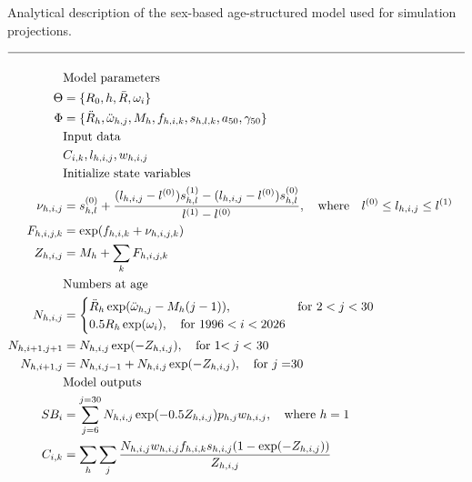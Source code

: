 \begin{table}
	\caption{Analytical description of the sex-based age-structured model used for simulation projections.}
	\label{tab:model_description}
	\begin{center}
		\tableEq
		\begin{align}
			\hline \nonumber\\
			&\mbox{Model parameters} \nonumber\\
			\Theta &= \{R_0,h,\bar{R},\omega_{i}\}  \label{T1.1}\\
			\Phi   &= \{\ddot{R}_h,\ddot{\omega}_{h,j},M_h,f_{h,i,k},s_{h,l,k},a_{50},\gamma_{50}\}  \label{T1.2}\\
			&\mbox{Input data} \nonumber\\
			&C_{i,k}, l_{h,i,j},w_{h,i,j} \label{T1.3}\\
			&\mbox{Initialize state variables }\nonumber\\
			\nu_{h,i,j} &= s_{h,l}^{(0)}+ 
			\frac{ (l_{h,i,j}-l^{(0)})s_{h,l}^{(1)} - (l_{h,i,j}-l^{(0)})s_{h,l}^{(0)} }
			{ l^{(1)}-l^{(0)} }, \quad \mbox{where}
			\quad  l^{(0)} \leq l_{h,i,j} \leq l^{(1)} \label{T1.4}\\
			F_{h,i,j,k} &= \exp(f_{h,i,k} + \nu_{h,i,j,k}) \label{T1.5}\\
			Z_{h,i,j} & = M_h + \sum_k F_{h,i,j,k} \label{T1.6} \\
			&\mbox{Numbers at age}\nonumber\\
			N_{h,i,j} &= 
			\begin{cases}
				\ddot{R}_{h}\exp(\ddot{\omega}_{h,j}-M_h (j-1)), & \mbox{for $2<j<30$}\\
				0.5 R_h\exp(\omega_{i}), \quad \mbox{for $1996<i<2026$}\\
			\end{cases} \label{T1.7}\\
			N_{h,i+1,j+1} &= N_{h,i,j} \exp(-Z_{h,i,j}), \quad \mbox{for 1$<j<$ 30}\label{T1.8}\\
			N_{h,i+1,j} &= N_{h,i,j-1}+N_{h,i,j} \exp(-Z_{h,i,j}) , 
			\quad \mbox{for $j =$30}\label{T1.9}\\
			&\mbox{Model outputs}\nonumber\\
			SB_{i} &= \sum_{j=6}^{j=30} N_{h,i,j}\exp(-0.5Z_{h,i,j}) p_{h,j} w_{h,i,j},
			\quad \mbox{where $h=1$}\label{T1.10}\\
			C_{i,k} &=\sum_h \sum_j \frac{N_{h,i,j} w_{h,i,j} f_{h,i,k} s_{h,i,j}
			(1-\exp(-Z_{h,i,j}))}{Z_{h,i,j}}\label{T1.11}\\

\end{align}
\end{center}
\end{table}
